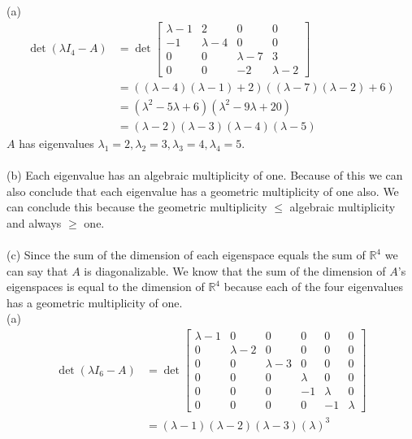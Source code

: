 \documentclass{report}
\begin{document}
(a) 
$$
\begin{aligned}
\det(\lambda I_4 - A) &= \det\begin{bmatrix}
\lambda-1&2&0&0\\
-1&\lambda-4&0&0\\
0&0&\lambda-7&3\\
0&0&-2&\lambda-2
\end{bmatrix} \\
&= ((\lambda-4)(\lambda-1)+2)((\lambda-7)(\lambda-2)+6) \\
&= (\lambda^2-5\lambda+6)(\lambda^2-9\lambda+20)\\
&= (\lambda-2)(\lambda-3)(\lambda-4)(\lambda-5)
\end{aligned}
$$
$A$ has eigenvalues $\lambda_1 = 2,  \lambda_2=3,\lambda_3=4,\lambda_4=5$.  \\
\\
\noindent (b) Each eigenvalue has an algebraic multiplicity of one.  Because of this we can also conclude that each eigenvalue has a geometric multiplicity of one also.  We can conclude this because the geometric multiplicity $\le$ algebraic multiplicity and always $\ge$ one.  \\
\\
\noindent (c) Since the sum of the dimension of each eigenspace equals the sum of $\mathbb{R}^4$ we can say that $A$ is diagonalizable.  We know that the sum of the dimension of $A$'s eigenspaces is equal to the dimension of $\mathbb{R}^4$ because each of the four eigenvalues has a geometric multiplicity of one. 
\sol \\
(a)
$$
\begin{aligned}
\det(\lambda I_6 - A) &= \det\begin{bmatrix}
\lambda-1& 0 & 0 & 0 & 0 & 0 \\
0 & \lambda-2 & 0 & 0 & 0 & 0 \\
0 & 0 & \lambda-3 & 0 & 0 & 0 \\
0 & 0 & 0 & \lambda & 0 & 0 \\
0 & 0 & 0 & -1 & \lambda & 0 \\
0 & 0 & 0 & 0 & -1 & \lambda
\end{bmatrix}\\
&=(\lambda-1)(\lambda-2)(\lambda-3)(\lambda)^3
\end{aligned}
$$
\end{document}
